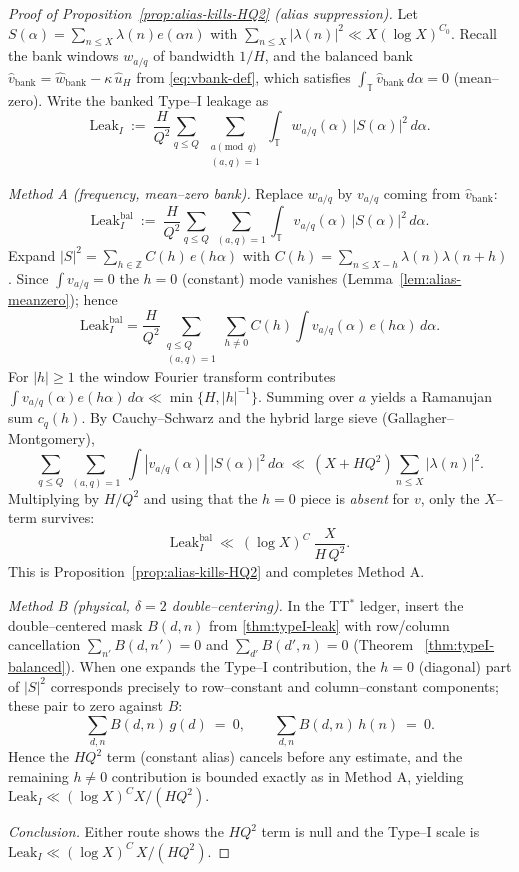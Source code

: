 \begin{proof}[Proof of Proposition~\ref{prop:alias-kills-HQ2} (alias suppression)]
Let $S(\alpha)=\sum_{n\le X}\lambda(n)e(\alpha n)$ with $\sum_{n\le X}|\lambda(n)|^2\ll X(\log X)^{C_0}$.
Recall the bank windows $w_{a/q}$ of bandwidth $1/H$, and the balanced bank
$\widehat v_{\mathrm{bank}}=\widehat w_{\mathrm{bank}}-\kappa\,\widehat u_H$ from \eqref{eq:vbank-def}, which satisfies
$\int_{\mathbb T}\widehat v_{\mathrm{bank}}\,d\alpha=0$ (mean--zero).%
Write the banked Type--I leakage as
\[
\mathrm{Leak}_I\ :=\ \frac{H}{Q^2}\sum_{q\le Q}\ \sum_{\substack{a\!\!\!\pmod q\\(a,q)=1}}
\int_{\mathbb T} w_{a/q}(\alpha)\,|S(\alpha)|^2\,d\alpha .
\]

\emph{Method A (frequency, mean--zero bank).}
Replace $w_{a/q}$ by $v_{a/q}$ coming from $\widehat v_{\mathrm{bank}}$:
\[
\mathrm{Leak}^{\mathrm{bal}}_I\ :=\ \frac{H}{Q^2}\sum_{q\le Q}\ \sum_{(a,q)=1}
\int_{\mathbb T} v_{a/q}(\alpha)\,|S(\alpha)|^2\,d\alpha .
\]
Expand $|S|^2=\sum_{h\in\mathbb Z} C(h)\,e(h\alpha)$ with
$C(h)=\sum_{n\le X-h}\lambda(n)\lambda(n+h)$. Since $\int v_{a/q}=0$
the $h=0$ (constant) mode vanishes (Lemma~\ref{lem:alias-meanzero}); hence
\[
\mathrm{Leak}^{\mathrm{bal}}_I
=\frac{H}{Q^2}\sum_{\substack{q\le Q\\ (a,q)=1}}
\sum_{h\ne 0} C(h)\!\!\int v_{a/q}(\alpha)\,e(h\alpha)\,d\alpha.
\]
For $|h|\ge 1$ the window Fourier transform contributes
$\int v_{a/q}(\alpha)e(h\alpha)\,d\alpha \ll \min\{H,|h|^{-1}\}$.
Summing over $a$ yields a Ramanujan sum $c_q(h)$.
By Cauchy--Schwarz and the hybrid large sieve (Gallagher--Montgomery),
\[
\sum_{q\le Q}\ \sum_{(a,q)=1}\ \int |v_{a/q}(\alpha)|\,|S(\alpha)|^2\,d\alpha
\ \ll\ (X+HQ^2)\sum_{n\le X}|\lambda(n)|^2.
\]
Multiplying by $H/Q^2$ and using that the $h=0$ piece is \emph{absent} for $v$,
only the $X$--term survives:
\[
\mathrm{Leak}^{\mathrm{bal}}_I\ \ll\ (\log X)^C\ \frac{X}{H\,Q^2}.
\]
This is Proposition~\ref{prop:alias-kills-HQ2} and completes Method A.

\emph{Method B (physical, $\delta=2$ double--centering).}
In the TT$^\ast$ ledger, insert the double--centered mask $B(d,n)$ from \eqref{thm:typeI-leak}
with row/column cancellation
$\sum_{n'}B(d,n')=0$ and $\sum_{d'}B(d',n)=0$ (Theorem ~\ref{thm:typeI-balanced}).
When one expands the Type--I contribution, the $h=0$ (diagonal) part of $|S|^2$
corresponds precisely to row--constant and column--constant components; these pair to zero
against $B$:
\[
\sum_{d,n} B(d,n)\,g(d)\ =\ 0,\qquad
\sum_{d,n} B(d,n)\,h(n)\ =\ 0.
\]
Hence the $HQ^2$ term (constant alias) cancels before any estimate, and the remaining
$h\ne 0$ contribution is bounded exactly as in Method A, yielding
$\mathrm{Leak}_I\ll (\log X)^C X/(H Q^2)$.

\emph{Conclusion.}
Either route shows the $HQ^2$ term is null and the Type--I scale is
\(
\mathrm{Leak}_I\ll (\log X)^C\, X/(H Q^2).
\)
\end{proof}

